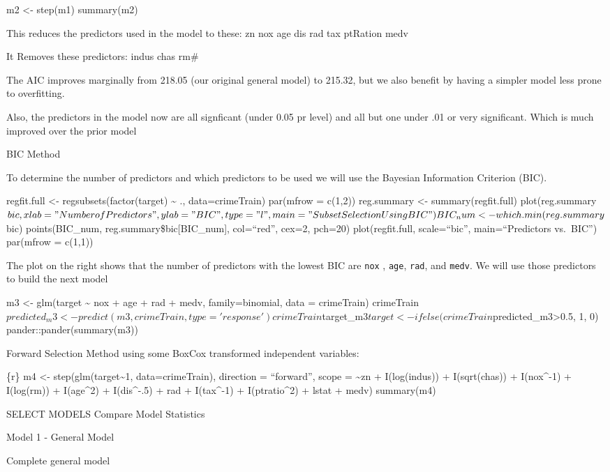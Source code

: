 \documentclass[
]{article}
\begin{document}
m2 \textless- step(m1) summary(m2)

This reduces the predictors used in the model to these: zn nox age dis
rad tax ptRation medv

It Removes these predictors: indus chas rm\#

The AIC improves marginally from 218.05 (our original general model) to
215.32, but we also benefit by having a simpler model less prone to
overfitting.

Also, the predictors in the model now are all signficant (under 0.05 pr
level) and all but one under .01 or very significant. Which is much
improved over the prior model

BIC Method

To determine the number of predictors and which predictors to be used we
will use the Bayesian Information Criterion (BIC).

regfit.full \textless- regsubsets(factor(target) \textasciitilde{} .,
data=crimeTrain) par(mfrow = c(1,2)) reg.summary \textless-
summary(regfit.full)
plot(reg.summary\(bic, xlab="Number of Predictors", ylab="BIC", type="l", main="Subset Selection Using BIC") BIC_num <- which.min(reg.summary\)bic)
points(BIC\_num, reg.summary\$bic{[}BIC\_num{]}, col=``red'', cex=2,
pch=20) plot(regfit.full, scale=``bic'', main=``Predictors vs.~BIC'')
par(mfrow = c(1,1))

The plot on the right shows that the number of predictors with the
lowest BIC are \texttt{nox} , \texttt{age}, \texttt{rad}, and
\texttt{medv}. We will use those predictors to build the next model

m3 \textless- glm(target \textasciitilde{} nox + age + rad + medv,
family=binomial, data = crimeTrain)
crimeTrain\(predicted_m3<- predict(m3, crimeTrain, type='response') crimeTrain\)target\_m3\(target <- ifelse(crimeTrain\)predicted\_m3\textgreater0.5,
1, 0) pander::pander(summary(m3))

Forward Selection Method using some BoxCox transformed independent
variables:

\{r\} m4 \textless- step(glm(target\textasciitilde1, data=crimeTrain),
direction = ``forward'', scope = \textasciitilde zn + I(log(indus)) +
I(sqrt(chas)) + I(nox\^{}-1) + I(log(rm)) + I(age\^{}2) + I(dis\^{}-.5)
+ rad + I(tax\^{}-1) + I(ptratio\^{}2) + lstat + medv) summary(m4)

SELECT MODELS Compare Model Statistics

Model 1 - General Model

Complete general model
\end{document}
